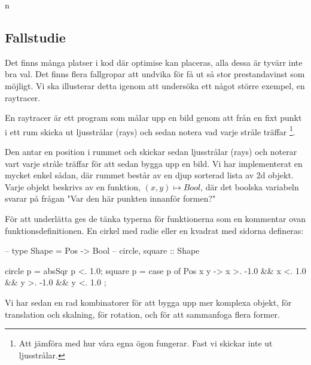 n\documentclass[../Optimise]{subfiles}
\begin{document}
\subsection{Fallstudie}


Det finns många platser i kod där optimise kan placeras, alla dessa är tyvärr 
inte bra val. Det finns flera fallgropar att undvika för få ut så stor 
prestandavinst som möjligt. Vi ska illusterar detta igenom att undersöka ett 
något större exempel, en raytracer.

En raytracer är ett program som målar upp en bild genom att från en fixt punkt
i ett rum skicka ut ljusstrålar (rays) och sedan notera vad varje stråle träffar
\footnote{Att jämföra med hur våra egna ögon fungerar. 
          Fast vi skickar inte ut ljusstrålar.}.

Den antar en position i rummet och skickar sedan ljusstrålar (rays) och noterar
vart varje stråle träffar för att sedan bygga upp en bild. Vi har implementerat
en mycket enkel sådan, där rummet består av en djup sorterad lista av 2d objekt.
Varje objekt beskrivs av en funktion, $(x,y) \mapsto Bool$, där det boolska
variabeln svarar på frågan "Var den här punkten innanför formen?"

För att underlätta ges de tänka typerna för funktionerna som en kommentar ovan funktionsdefinitionen.
En cirkel med radie  eller en kvadrat med sidorna  defineras:
\begin{codeEx}
-- type Shape = Pos -> Bool
-- circle, square :: Shape

circle p = absSqr p <. 1.0;
square p = case p of
    { Pos x y -> x >. -1.0 && x <. 1.0
              && y >. -1.0 && y <. 1.0
    };

\end{codeEx}

Vi har sedan en rad kombinatorer för att bygga upp mer komplexa objekt,
för translation och skalning, för rotation, och för att sammanfoga 
flera former.

\end{document}
